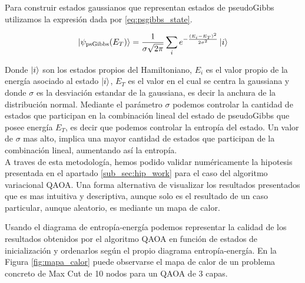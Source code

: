 Para construir estados gaussianos que representan estados de pseudoGibbs utilizamos la expresión dada por \ref{eq:psgibbs_state}.

\begin{equation}
    \ket{\psi_{\text{psGibbs}}(E_{T})} = \frac{1}{\sigma \sqrt{2 \pi}} \sum_{i}e^{-\frac{(E_{i} - E_{T})^2}{2 \sigma^2}} \ket{i}
    \label{eq:psgibbs_state}
\end{equation}

Donde $\ket{i}$ son los estados propios del Hamiltoniano, $E_{i}$ es el valor propio de la energía asociado al estado $\ket{i}$, $E_T$ es el valor en el cual se centra la gaussiana y donde $\sigma$ es la desviación estandar de la gaussiana, es decir la anchura de la distribución normal. Mediante el parámetro $\sigma$ podemos controlar la cantidad de estados que participan en la combinación lineal del estado de pseudoGibbs que posee energía $E_T$, es decir que podemos controlar la entropía del estado. Un valor de $\sigma$ mas alto, implica una mayor cantidad de estados que participan de la combinación lineal, aumentando así la entropía. \\

A traves de esta metodología, hemos podido validar numéricamente la hipotesis presentada en el apartado \ref{sub_sec:hip_work} para el caso del algoritmo variacional QAOA. Una forma alternativa de visualizar los resultados presentados que es mas intuitiva y descriptiva, aunque solo es el resultado de un caso particular, aunque aleatorio, es mediante un mapa de calor. 

\newpage

Usando el diagrama de entropía-energía podemos representar la calidad de los resultados obtenidos por el algoritmo QAOA en función de estados de inicialización y ordenarlos según el propio diagrama entropía-energía. En la Figura \ref{fig:mapa_calor} puede observarse el mapa de calor de un problema concreto de Max Cut de 10 nodos para un QAOA de 3 capas.


